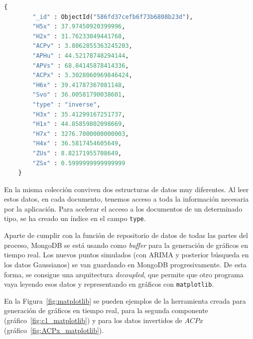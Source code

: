 \documentclass[11pt,spanish,listoffigures,listoftables]{tfgetsinf}
\begin{document}
        \begin{lstlisting}[language=Python, caption=Documento de tipo {\tt inverse}., label={lst:generated_inverse}]
    {
        "_id" : ObjectId("586fd37cefb6f73b6808b23d"),
        "H5x" : 37.97450920399996,
        "H2x" : 31.76233049441768,
        "ACPv" : 3.8062855363245203,
        "APHu" : 44.52178748294144,
        "APVs" : 68.84145878414336,
        "ACPx" : 3.3028060969846424,
        "H6x" : 39.41787367081148,
        "Svo" : 36.00581790038601,
        "type" : "inverse",
        "H3x" : 35.41299167251737,
        "H1x" : 44.85859802098669,
        "H7x" : 3276.7000000000003,
        "H4x" : 36.5817454605649,
        "ZUs" : 8.82171955708649,
        "ZSx" : 0.5999999999999999
    }
        \end{lstlisting}
        
        En la misma colección conviven dos estructuras de datos muy diferentes. Al leer estos datos, en cada documento, tenemos acceso a toda la información necesaria por la aplicación. Para acelerar el acceso a los documentos de un determinado tipo, se ha creado un índice en el campo {\tt type}.
        
        Aparte de cumplir con la función de repositorio de datos de todas las partes del proceso, MongoDB se está usando como {\em buffer} para la generación de gráficos en tiempo real. Los nuevos puntos simulados (con ARIMA y posterior búsqueda en los datos Gaussianos) se van guardando en MongoDB progresivamente. De esta forma, se consigue una arquitectura {\em decoupled}, que permite que otro programa vaya leyendo esos datos y representando en gráficos con {\tt matplotlib}. 
        
        En la Figura~\ref{fig:matplotlib} se pueden ejemplos de la herramienta creada para generación de gráficos en tiempo real, para la segunda componente (gráfico~\ref{fig:c1_matplotlib}) y para los datos invertidos de \(ACPx\) (gráfico~\ref{fig:ACPx_matplotlib}). 
        
\end{document}
